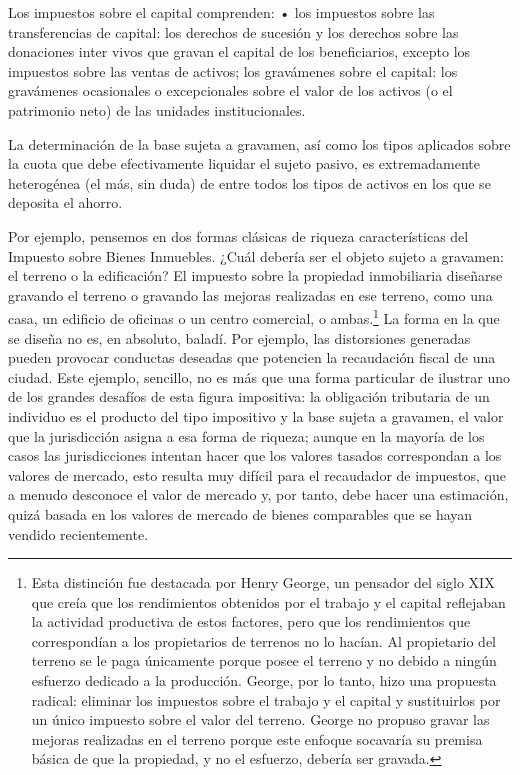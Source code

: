 \documentclass[10pt,a4paper]{article}
\begin{document}
Los impuestos sobre el capital comprenden: 
• los impuestos sobre las transferencias de capital: los derechos de sucesión y los derechos sobre las donaciones inter vivos que gravan el capital de los beneficiarios, excepto los impuestos sobre las ventas de activos; 
los gravámenes sobre el capital: los gravámenes ocasionales o excepcionales sobre el valor de los activos (o el patrimonio neto) de las unidades institucionales. 


La determinación de la base sujeta a gravamen, así como los tipos aplicados sobre la cuota que debe efectivamente liquidar el sujeto pasivo, es extremadamente heterogénea (el más, sin duda) de entre todos los tipos de activos en los que se deposita el ahorro.



Por ejemplo, pensemos en dos formas clásicas de riqueza características del Impuesto sobre Bienes Inmuebles. ¿Cuál debería ser el objeto sujeto a gravamen: el terreno o la edificación? El impuesto sobre la propiedad inmobiliaria diseñarse gravando el terreno o gravando las mejoras realizadas en ese terreno, como una casa, un edificio de oficinas o un centro comercial, o ambas.\footnote{%
    Esta distinción fue destacada por Henry George, un pensador del siglo XIX que creía que los rendimientos obtenidos por el trabajo y el capital reflejaban la actividad productiva de estos factores, pero que los rendimientos que correspondían a los propietarios de terrenos no lo hacían. Al propietario del terreno se le paga únicamente porque posee el terreno y no debido a ningún esfuerzo dedicado a la producción. George, por lo tanto, hizo una propuesta radical: eliminar los impuestos sobre el trabajo y el capital y sustituirlos por un único impuesto sobre el valor del terreno. George no propuso gravar las mejoras realizadas en el terreno porque este enfoque socavaría su premisa básica de que la propiedad, y no el esfuerzo, debería ser gravada.
} La forma en la que se diseña no es, en absoluto, baladí. Por ejemplo, las distorsiones generadas pueden provocar conductas deseadas que potencien la recaudación fiscal de una ciudad. Este ejemplo, sencillo, no es más que una forma particular de ilustrar uno de los grandes desafíos de esta figura impositiva: la obligación tributaria de un individuo es el producto del tipo impositivo y la base sujeta a gravamen, el valor que la jurisdicción asigna a esa forma de riqueza; aunque en la mayoría de los casos las jurisdicciones intentan hacer que los valores tasados correspondan a los valores de mercado, esto resulta muy difícil para el recaudador de impuestos, que a menudo desconoce el valor de mercado y, por tanto, debe hacer una estimación, quizá basada en los valores de mercado de bienes comparables que se hayan vendido recientemente.
\end{document}
